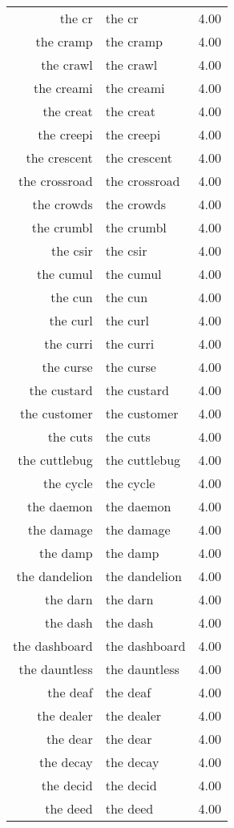\begin{table}[ht]
\begin{tabular}{rlr}
  the cr & the cr & 4.00 \\ 
  the cramp & the cramp & 4.00 \\ 
  the crawl & the crawl & 4.00 \\ 
  the creami & the creami & 4.00 \\ 
  the creat & the creat & 4.00 \\ 
  the creepi & the creepi & 4.00 \\ 
  the crescent & the crescent & 4.00 \\ 
  the crossroad & the crossroad & 4.00 \\ 
  the crowds & the crowds & 4.00 \\ 
  the crumbl & the crumbl & 4.00 \\ 
  the csir & the csir & 4.00 \\ 
  the cumul & the cumul & 4.00 \\ 
  the cun & the cun & 4.00 \\ 
  the curl & the curl & 4.00 \\ 
  the curri & the curri & 4.00 \\ 
  the curse & the curse & 4.00 \\ 
  the custard & the custard & 4.00 \\ 
  the customer & the customer & 4.00 \\ 
  the cuts & the cuts & 4.00 \\ 
  the cuttlebug & the cuttlebug & 4.00 \\ 
  the cycle & the cycle & 4.00 \\ 
  the daemon & the daemon & 4.00 \\ 
  the damage & the damage & 4.00 \\ 
  the damp & the damp & 4.00 \\ 
  the dandelion & the dandelion & 4.00 \\ 
  the darn & the darn & 4.00 \\ 
  the dash & the dash & 4.00 \\ 
  the dashboard & the dashboard & 4.00 \\ 
  the dauntless & the dauntless & 4.00 \\ 
  the deaf & the deaf & 4.00 \\ 
  the dealer & the dealer & 4.00 \\ 
  the dear & the dear & 4.00 \\ 
  the decay & the decay & 4.00 \\ 
  the decid & the decid & 4.00 \\ 
  the deed & the deed & 4.00 \\ 

\end{tabular}
\end{table}
